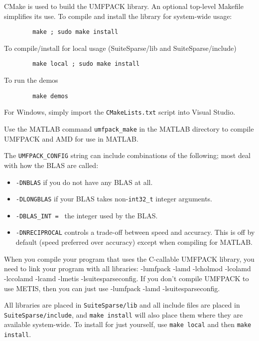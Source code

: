 \documentclass[11pt]{article}
\begin{document}
CMake is used to build the UMFPACK library.  An optional top-level Makefile
simplifies its use.  To compile and install the library for system-wide usage:

\begin{verbatim}
        make ; sudo make install
\end{verbatim}

    To compile/install for local usage (SuiteSparse/lib and SuiteSparse/include)

\begin{verbatim}
        make local ; sudo make install
\end{verbatim}

    To run the demos

\begin{verbatim}
        make demos
\end{verbatim}

For Windows, simply import the \verb'CMakeLists.txt' script into Visual Studio.

Use the MATLAB command {\tt umfpack\_make} in the MATLAB directory
to compile UMFPACK and AMD for use in MATLAB.

The {\tt UMFPACK\_CONFIG} string can include combinations of the following;
most deal with how the BLAS are called:
\begin{itemize}
\item {\tt -DNBLAS} if you do not have any BLAS at all.
\item {\tt -DLONGBLAS} if your BLAS takes non-\verb'int32_t' integer arguments.
\item {\tt -DBLAS\_INT = } the integer used by the BLAS.

\item {\tt -DNRECIPROCAL} controls a trade-off between speed and accuracy.
    This is off by default (speed preferred over accuracy) except when
    compiling for MATLAB.
\end{itemize}

When you compile your program that uses the C-callable UMFPACK library,
you need to link your program with all libraries:
-lumfpack -lamd -lcholmod -lcolamd -lccolamd -lcamd -lmetis -lsuitesparseconfig.
If you don't compile UMFPACK to use METIS, then you can  just use
-lumfpack -lamd -lsuitesparseconfig.

All libraries are placed in {\tt SuiteSparse/lib} and all include files are
placed in {\tt SuiteSparse/include}, and \verb'make install' will also place
them where they are available system-wide.  To install for just yourself, use
\verb'make local' and then \verb'make install'.
\end{document}
